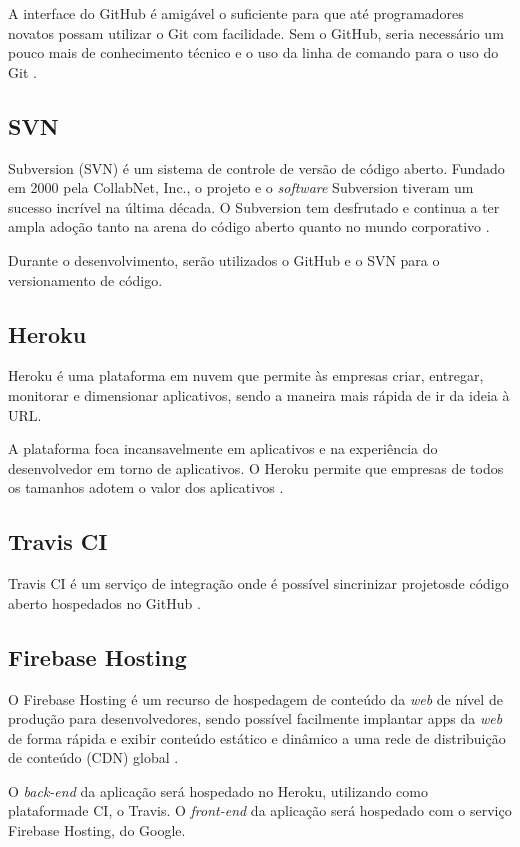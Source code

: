 \documentclass[
    12pt,               %
    openright,          %
    oneside,
    a4paper,            %
    paginasA3,  %
    MODELO,             %
    TODO,               %
    english,            %
    brazil              %
    ]{ifsp-spo-inf-ctds} %
\begin{document}
A interface do GitHub é amigável o suficiente para que até programadores novatos possam utilizar o Git com facilidade. Sem o GitHub, seria necessário um pouco mais de conhecimento técnico e o uso da linha de comando para o uso do Git \cite{github:2021}.

\subsection{SVN}
Subversion (SVN) é um sistema de controle de versão de código aberto. Fundado em 2000 pela CollabNet, Inc., o projeto e o \textit{software} Subversion tiveram um sucesso incrível na última década. O Subversion tem desfrutado e continua a ter ampla adoção tanto na arena do código aberto quanto no mundo corporativo \cite{svn:2021}.

Durante o desenvolvimento, serão utilizados o GitHub e o SVN para o versionamento de código.

\subsection{Heroku}
Heroku é uma plataforma em nuvem que permite às empresas criar, entregar, monitorar e dimensionar aplicativos, sendo a maneira mais rápida de ir da ideia à URL.

A plataforma foca incansavelmente em aplicativos e na experiência do desenvolvedor em torno de aplicativos. O Heroku permite que empresas de todos os tamanhos adotem o valor dos aplicativos \cite{heroku:2021}.

\subsection{Travis CI}
Travis CI é um serviço de integração onde é possível sincrinizar projetosde código aberto hospedados no GitHub \cite{travis:2021}.

\subsection{Firebase Hosting}
O Firebase Hosting é um recurso de hospedagem de conteúdo da \textit{web} de nível de produção para desenvolvedores, sendo possível facilmente implantar apps da \textit{web} de forma rápida e exibir conteúdo estático e dinâmico a uma rede de distribuição de conteúdo (CDN) global \cite{hosting:2020}.

O \textit{back-end} da aplicação será hospedado no Heroku, utilizando como plataformade CI, o Travis. O \textit{front-end} da aplicação será hospedado com o serviço Firebase Hosting, do Google.
\end{document}
